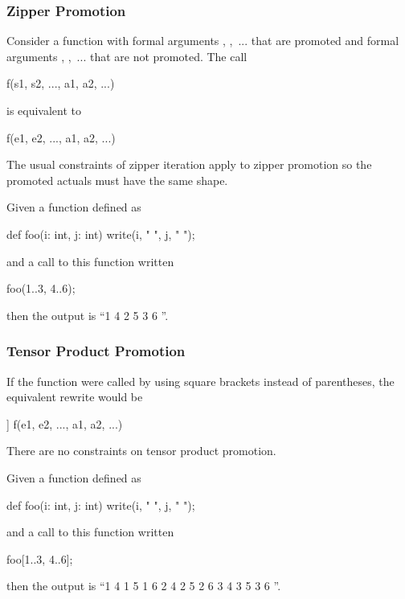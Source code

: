 \subsubsection{Zipper Promotion}
\label{Zipper_Promotion}

Consider a function  with formal
arguments , ,~... that are promoted and formal
arguments , ,~... that are not promoted.  The call
\begin{chapel}
f(s1, s2, ..., a1, a2, ...)
\end{chapel}
is equivalent to
\begin{chapel}
[(e1, e2, ...) in (s1, s2, ...)] f(e1, e2, ..., a1, a2, ...)
\end{chapel}
The usual constraints of zipper iteration apply to zipper promotion so
the promoted actuals must have the same shape.

\begin{example}
Given a function defined as
\begin{chapel}
def foo(i: int, j: int) {
  write(i, " ", j, " ");
}
\end{chapel}
and a call to this function written
\begin{chapel}
foo(1..3, 4..6);
\end{chapel}
then the output is ``1 4 2 5 3 6 ''.
\end{example}

\subsubsection{Tensor Product Promotion}
\label{Tensor_Product_Promotion}

If the function  were called by using square brackets instead
of parentheses, the equivalent rewrite would be
\begin{chapel}
[(e1, e2, ...) in [s1, s2, ...]] f(e1, e2, ..., a1, a2, ...)
\end{chapel}
There are no constraints on tensor product promotion.

\begin{example}
Given a function defined as
\begin{chapel}
def foo(i: int, j: int) {
  write(i, " ", j, " ");
}
\end{chapel}
and a call to this function written
\begin{chapel}
foo[1..3, 4..6];
\end{chapel}
then the output is ``1 4 1 5 1 6 2 4 2 5 2 6 3 4 3 5 3 6 ''.
\end{example}

